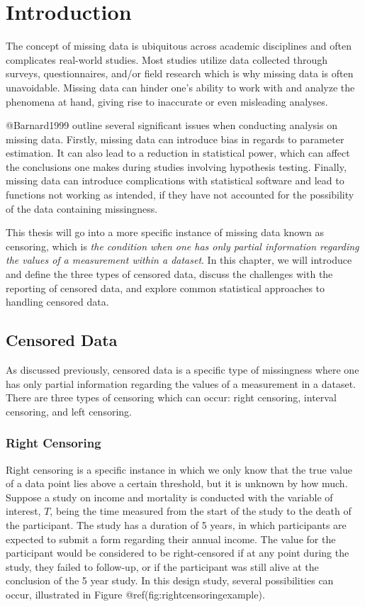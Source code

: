 \documentclass[
]{article}
\author{}
\date{\vspace{-2.5em}}
\begin{document}
\hypertarget{intro}{%
\section{Introduction}\label{intro}}

The concept of missing data is ubiquitous across academic disciplines
and often complicates real-world studies. Most studies utilize data
collected through surveys, questionnaires, and/or field research which
is why missing data is often unavoidable. Missing data can hinder one's
ability to work with and analyze the phenomena at hand, giving rise to
inaccurate or even misleading analyses.

@Barnard1999 outline several significant issues when conducting analysis
on missing data. Firstly, missing data can introduce bias in regards to
parameter estimation. It can also lead to a reduction in statistical
power, which can affect the conclusions one makes during studies
involving hypothesis testing. Finally, missing data can introduce
complications with statistical software and lead to functions not
working as intended, if they have not accounted for the possibility of
the data containing missingness.

This thesis will go into a more specific instance of missing data known
as censoring, which is \emph{the condition when one has only partial
information regarding the values of a measurement within a dataset}. In
this chapter, we will introduce and define the three types of censored
data, discuss the challenges with the reporting of censored data, and
explore common statistical approaches to handling censored data.

\hypertarget{censored_data}{%
\subsection{Censored Data}\label{censored_data}}

As discussed previously, censored data is a specific type of missingness
where one has only partial information regarding the values of a
measurement in a dataset. There are three types of censoring which can
occur: right censoring, interval censoring, and left censoring.

\hypertarget{right}{%
\subsubsection{Right Censoring}\label{right}}

Right censoring is a specific instance in which we only know that the
true value of a data point lies above a certain threshold, but it is
unknown by how much. Suppose a study on income and mortality is
conducted with the variable of interest, \(T\), being the time measured
from the start of the study to the death of the participant. The study
has a duration of 5 years, in which participants are expected to submit
a form regarding their annual income. The value for the participant
would be considered to be right-censored if at any point during the
study, they failed to follow-up, or if the participant was still alive
at the conclusion of the 5 year study. In this design study, several
possibilities can occur, illustrated in Figure
@ref(fig:rightcensoringexample).
\end{document}
